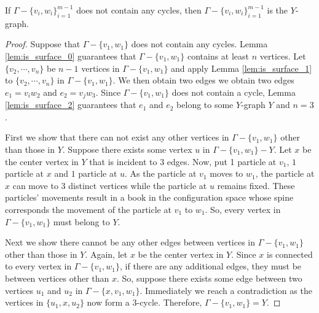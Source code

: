 \begin{lem}
\label{lem:manifolds_Y}
If \(\Gamma - \{v_i, w_i\}_{i=1}^{m-1}\) does not contain any cycles, then \(\Gamma - \{v_i, w_i\}_{i=1}^{m-1}\) is the \(Y\)-graph.
\end{lem}
\begin{proof}
Suppose that \(\Gamma - \{v_1, w_1\}\) does not contain any cycles.
Lemma \ref{lem:is_surface_0} guarantees that \(\Gamma - \{v_1, w_1\}\) contains
at least \(n\) vertices.
Let \(\{v_2, \cdots, v_n\}\) be \(n-1\) vertices in \(\Gamma - \{v_1, w_1\}\)
and apply Lemma \ref{lem:is_surface_1} to \(\{v_2, \cdots, v_n\}\) in \(\Gamma - \{v_1, w_1\}\).
We then obtain two edges we obtain two edges \(e_1 = v_i w_2\) and \(e_2 = v_j w_3\).
Since \(\Gamma - \{v_1, w_1\}\) does not contain a cycle, Lemma \ref{lem:is_surface_2} guarantees that
\(e_1\) and \(e_2\) belong to some \(Y\)-graph \(Y\) and \(n = 3\).

First we show that there can not exist any other vertices in \(\Gamma - \{v_1, w_1\}\) other than those in \(Y\).
Suppose there exists some vertex \(u\) in \(\Gamma - \{v_1, w_1\} - Y\). 
Let \(x\) be the center vertex in \(Y\) that is incident to \(3\) edges.
Now, put 1 particle at \(v_1\), \(1\) particle at \(x\) and \(1\) particle at \(u\).
As the particle at \(v_1\) moves to \(w_1\), the particle at \(x\) can move
to 3 distinct vertices while the particle at \(u\) remains fixed.
These particles' movements result in a book in the configuration space
whose spine corresponds the movement of the particle at \(v_1\) to \(w_1\).
So, every vertex in \(\Gamma - \{v_1, w_1\}\) must belong to \(Y\).

Next we show there cannot be any other edges between vertices in \(\Gamma - \{v_1, w_1\}\)
other than those in \(Y\). Again, let \(x\) be the center vertex in \(Y\).
Since \(x\) is connected to every vertex in \(\Gamma - \{v_1, w_1\}\), if 
there are any additional edges, they must be between vertices other than \(x\).
So, suppose there exists some edge between two vertices \(u_1\) and \(u_2\) in \(\Gamma - \{x, v_1, w_1\}\).
Immediately we reach a contradiction as the vertices in \(\{u_1, x, u_2\}\) now form a \(3\)-cycle.
Therefore, \(\Gamma - \{v_1, w_1\} = Y\).
\end{proof}
